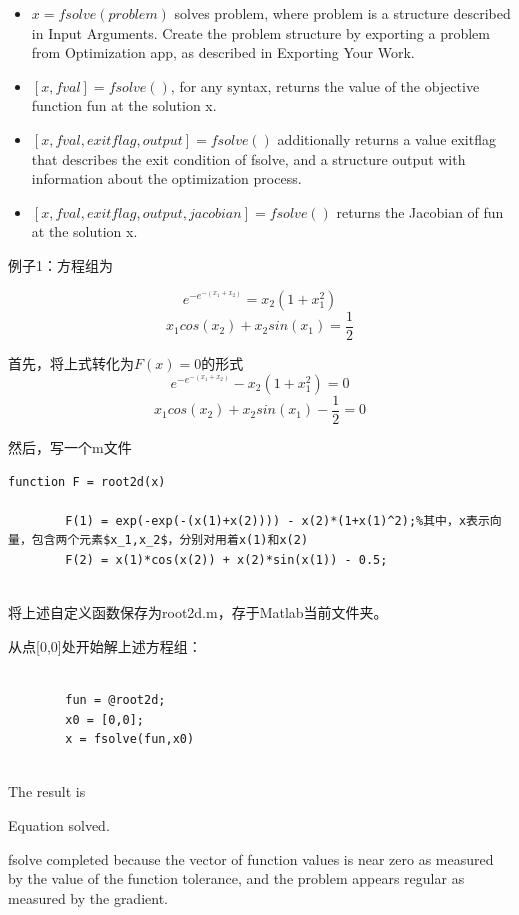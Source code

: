 \documentclass[10pt,math=newtx,citestyle=gb7714-2015,bibstyle=gb7714-2015]{elegantbook}
\begin{document}
{{{\begin{itemize}
		\item $x = fsolve(problem)$ solves problem, where problem is a structure described in Input Arguments. Create the problem structure by exporting a problem from Optimization app, as described in Exporting Your Work.
		
		\item $[x,fval] = fsolve()$, for any syntax, returns the value of the objective function fun at the solution x.
		
		
		\item $[x,fval,exitflag,output] = fsolve()$ additionally returns a value exitflag that describes the exit condition of fsolve, and a structure output with information about the optimization process.
		
		\item $[x,fval,exitflag,output,jacobian] = fsolve()$ returns the Jacobian of fun at the solution x.
		
		
	\end{itemize}
	
	例子1：方程组为
	
	$$e^{-e^{-(x_1+x_2)}}=x_2(1+x_1^2)$$
	$$x_1cos(x_2)+x_2sin(x_1)=\frac{1}{2}$$
	
	首先，将上式转化为$F(x)=0$的形式
	$$e^{-e^{-(x_1+x_2)}}-x_2(1+x_1^2)=0$$
	$$x_1cos(x_2)+x_2sin(x_1)-\frac{1}{2}=0$$
	
	然后，写一个m文件
	\begin{lstlisting}[frame=shadowbox]
		function F = root2d(x)
		
		F(1) = exp(-exp(-(x(1)+x(2)))) - x(2)*(1+x(1)^2);%其中，x表示向量，包含两个元素$x_1,x_2$，分别对用着x(1)和x(2)
		F(2) = x(1)*cos(x(2)) + x(2)*sin(x(1)) - 0.5;
		
	\end{lstlisting}
	
	将上述自定义函数保存为root2d.m，存于Matlab当前文件夹。
	
	从点[0,0]处开始解上述方程组：
	\begin{lstlisting}[frame=shadowbox]
		
		fun = @root2d;
		x0 = [0,0];
		x = fsolve(fun,x0)
		
	\end{lstlisting}
	
	The result is
	
	Equation solved.
	
	fsolve completed because the vector of function values is near zero as measured by the value of the function tolerance, and
	the problem appears regular as measured by the gradient.
	
}}}
\end{document}
